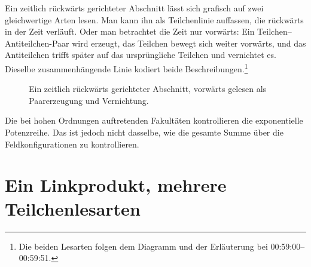 Ein zeitlich rückwärts gerichteter Abschnitt lässt sich grafisch auf zwei gleichwertige Arten lesen. Man kann ihn als Teilchenlinie auffassen, die rückwärts in der Zeit verläuft. Oder man betrachtet die Zeit nur vorwärts: Ein Teilchen--Antiteilchen-Paar wird erzeugt, das Teilchen bewegt sich weiter vorwärts, und das Antiteilchen trifft später auf das ursprüngliche Teilchen und vernichtet es. Dieselbe zusammenhängende Linie kodiert beide Beschreibungen.\footnote{Die beiden Lesarten folgen dem Diagramm und der Erläuterung bei 00:59:00--00:59:51.}

\begin{figure}[htbp]
\centering
{}
\caption{Ein zeitlich rückwärts gerichteter Abschnitt, vorwärts gelesen als Paarerzeugung und Vernichtung.}
\end{figure}

Die bei hohen Ordnungen auftretenden Fakultäten kontrollieren die exponentielle Potenzreihe. Das ist jedoch nicht dasselbe, wie die gesamte Summe über die Feldkonfigurationen zu kontrollieren.

\begin{classroomqa}
\end{classroomqa}

\section{Ein Linkprodukt, mehrere Teilchenlesarten}

